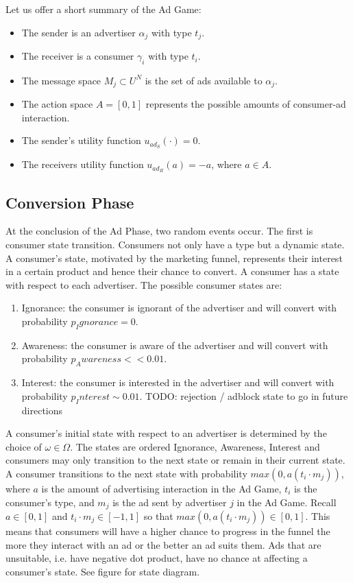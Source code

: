 \documentclass{article}
\begin{document}
Let us offer a short summary of the Ad Game:

\begin{itemize}
	\item The sender is an advertiser $\alpha_j$ with type $t_j$.
	\item The receiver is a consumer $\gamma_i$ with type $t_i$.
	\item The message space $M_j \subset U^N$ is the set of ads available to $\alpha_j$.
	\item The action space $A = [0,1]$ represents the possible amounts of consumer-ad interaction.
	\item The sender's utility function $u_{ad_S}(\cdot) = 0$.
	\item The receivers utility function $u_{ad_R}(a) = -a$, where $a \in A$.
\end{itemize}

\subsection{Conversion Phase}

At the conclusion of the Ad Phase, two random events occur. The first is consumer state transition. Consumers not only have a type but a dynamic state. A consumer's state, motivated by the marketing funnel, represents their interest in a certain product and hence their chance to convert. A consumer has a state with respect to each advertiser. The possible consumer states are:

\begin{enumerate}
	\item Ignorance: the consumer is ignorant of the advertiser and will convert with probability $p_Ignorance = 0$.
	\item Awareness: the consumer is aware of the advertiser and will convert with probability $p_Awareness << 0.01$.
	\item Interest: the consumer is interested in the advertiser and will convert with probability $p_Interest \sim 0.01$.
TODO: rejection / adblock state to go in future directions
\end{enumerate}

A consumer's initial state with respect to an advertiser is determined by the choice of $\omega \in \Omega$. The states are ordered Ignorance, Awareness, Interest and consumers may only transition to the next state or remain in their current state. A consumer transitions to the next state with probability $max(0, a (t_i \cdot m_j))$, where $a$ is the amount of advertising interaction in the Ad Game, $t_i$ is the consumer's type, and $m_j$ is the ad sent by advertiser $j$ in the Ad Game. Recall $a \in [0,1]$ and $t_i \cdot m_j \in [-1,1]$ so that $max(0, a (t_i \cdot m_j)) \in [0,1]$. This means that consumers will have a higher chance to progress in the funnel the more they interact with an ad or the better an ad suits them. Ads that are unsuitable, i.e. have negative dot product, have no chance at affecting a consumer's state. See figure for state diagram.
\end{document}

